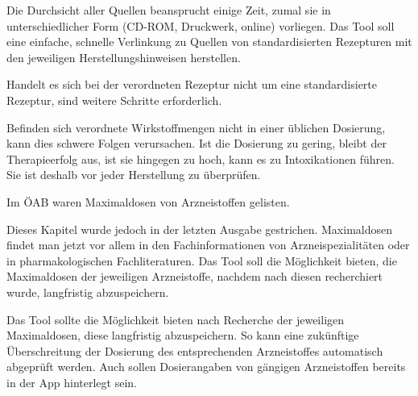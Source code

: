 \documentclass[12pt,a4paper]{article}
\begin{document}
Die Durchsicht aller Quellen beansprucht einige Zeit, zumal sie in unterschiedlicher Form (CD-ROM, Druckwerk, online) vorliegen. 
Das Tool soll eine einfache, schnelle Verlinkung zu Quellen von standardisierten Rezepturen mit den jeweiligen Herstellungshinweisen herstellen. 

Handelt es sich bei der verordneten Rezeptur nicht um eine standardisierte Rezeptur, sind weitere Schritte erforderlich.


Befinden sich verordnete Wirkstoffmengen nicht in einer üblichen Dosierung, kann dies schwere Folgen verursachen. Ist die Dosierung zu gering, bleibt der Therapieerfolg aus, ist sie hingegen zu hoch, kann es zu Intoxikationen führen. Sie ist deshalb vor jeder Herstellung zu überprüfen. 

Im \ac{ÖAB} waren Maximaldosen von Arzneistoffen gelisten.

Dieses Kapitel wurde jedoch in der letzten Ausgabe gestrichen. Maximaldosen findet man jetzt vor allem in den Fachinformationen von Arzneispezialitäten oder in pharmakologischen Fachliteraturen. 
Das Tool soll die Möglichkeit bieten, die Maximaldosen der jeweiligen Arzneistoffe, nachdem nach diesen recherchiert wurde, langfristig abzuspeichern.

Das Tool sollte die Möglichkeit bieten nach Recherche der jeweiligen Maximaldosen, diese langfristig abzuspeichern. So kann eine zukünftige Überschreitung der Dosierung des entsprechenden Arzneistoffes automatisch abgeprüft werden.
Auch sollen Dosierangaben von gängigen Arzneistoffen bereits in der App hinterlegt sein.

\end{document}
